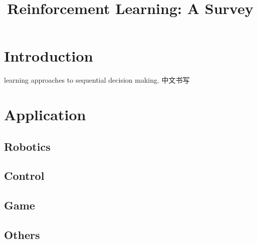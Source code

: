 \documentclass{article}
\begin{document}
\begin{CJK}{UTF8}{gbsn}

\title{Reinforcement Learning: A Survey}


\maketitle

\section{Introduction}
learning approaches to sequential decision making.
中文书写

\section{Application}
\subsection{Robotics}
\subsection{Control}
\subsection{Game}
\subsection{Others}




 
\end{CJK}
\end{document}
